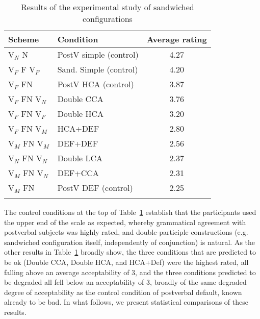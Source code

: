 \documentclass[output=paper
,modfonts
,nonflat]{langsci/langscibook}
\begin{document}
\begin{table}
\begin{tabular}{llc}
	\lsptoprule
Scheme & Condition & Average rating \\ \midrule
V$_N$ N & PostV simple (control) & 4.27 \\ 
V$_F$ F V$_F$ & Sand. Simple (control) & 4.20 \\ 
V$_F$ FN & PostV HCA (control) & 3.87 \\ 
V$_F$ FN V$_N$ & Double CCA & 3.76 \\ 
V$_F$ FN V$_F$ & Double HCA & 3.20 \\ 
V$_F$ FN V$_M$ & HCA+DEF & 2.80 \\ 
V$_M$ FN V$_M$ & DEF+DEF & 2.56 \\ 
V$_N$ FN V$_N$ & Double LCA & 2.37 \\ 
V$_M$ FN V$_N$ & DEF+CCA & 2.31 \\ 
V$_M$ FN & PostV DEF (control) & 2.25 \\ 
\lspbottomrule
\end{tabular}
\caption{Results of the experimental study of sandwiched configurations\label{tab:results}}
\end{table}

\noindent The control conditions at the top of Table~\ref{tab:results} establish that the participants used the upper end of the scale as expected, whereby grammatical agreement with postverbal subjects was highly rated, and double-participle constructions (e.g. sandwiched configuration itself, independently of conjunction) is natural. As the other results in Table~\ref{tab:results} broadly show, the three conditions that are predicted to be ok (Double CCA, Double HCA, and HCA+Def) were the highest rated, all falling above an average acceptability of 3, and the three conditions predicted to be degraded all fell below an acceptability of 3, broadly of the same degraded degree of acceptability as the control condition of postverbal default, known already to be bad. In what follows, we present statistical comparisons of these results. 


\end{document}
